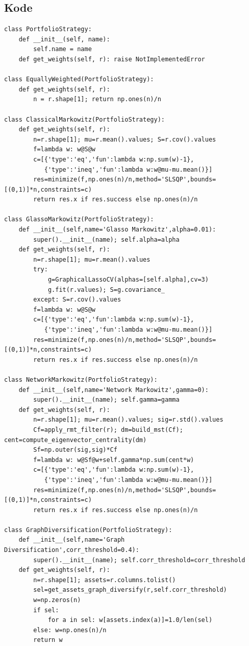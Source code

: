 \documentclass[12pt,a4paper]{article}
\begin{document}
\subsection{Kode}
\begin{lstlisting}[caption={Implementasi berbagai strategi portofolio}]
class PortfolioStrategy:
    def __init__(self, name):
        self.name = name
    def get_weights(self, r): raise NotImplementedError

class EquallyWeighted(PortfolioStrategy):
    def get_weights(self, r):
        n = r.shape[1]; return np.ones(n)/n

class ClassicalMarkowitz(PortfolioStrategy):
    def get_weights(self, r):
        n=r.shape[1]; mu=r.mean().values; S=r.cov().values
        f=lambda w: w@S@w
        c=[{'type':'eq','fun':lambda w:np.sum(w)-1},
           {'type':'ineq','fun':lambda w:w@mu-mu.mean()}]
        res=minimize(f,np.ones(n)/n,method='SLSQP',bounds=[(0,1)]*n,constraints=c)
        return res.x if res.success else np.ones(n)/n

class GlassoMarkowitz(PortfolioStrategy):
    def __init__(self,name='Glasso Markowitz',alpha=0.01):
        super().__init__(name); self.alpha=alpha
    def get_weights(self, r):
        n=r.shape[1]; mu=r.mean().values
        try:
            g=GraphicalLassoCV(alphas=[self.alpha],cv=3)
            g.fit(r.values); S=g.covariance_
        except: S=r.cov().values
        f=lambda w: w@S@w
        c=[{'type':'eq','fun':lambda w:np.sum(w)-1},
           {'type':'ineq','fun':lambda w:w@mu-mu.mean()}]
        res=minimize(f,np.ones(n)/n,method='SLSQP',bounds=[(0,1)]*n,constraints=c)
        return res.x if res.success else np.ones(n)/n

class NetworkMarkowitz(PortfolioStrategy):
    def __init__(self,name='Network Markowitz',gamma=0):
        super().__init__(name); self.gamma=gamma
    def get_weights(self, r):
        n=r.shape[1]; mu=r.mean().values; sig=r.std().values
        Cf=apply_rmt_filter(r); dm=build_mst(Cf); cent=compute_eigenvector_centrality(dm)
        Sf=np.outer(sig,sig)*Cf
        f=lambda w: w@Sf@w+self.gamma*np.sum(cent*w)
        c=[{'type':'eq','fun':lambda w:np.sum(w)-1},
           {'type':'ineq','fun':lambda w:w@mu-mu.mean()}]
        res=minimize(f,np.ones(n)/n,method='SLSQP',bounds=[(0,1)]*n,constraints=c)
        return res.x if res.success else np.ones(n)/n

class GraphDiversification(PortfolioStrategy):
    def __init__(self,name='Graph Diversification',corr_threshold=0.4):
        super().__init__(name); self.corr_threshold=corr_threshold
    def get_weights(self, r):
        n=r.shape[1]; assets=r.columns.tolist()
        sel=get_assets_graph_diversify(r,self.corr_threshold)
        w=np.zeros(n)
        if sel:
            for a in sel: w[assets.index(a)]=1.0/len(sel)
        else: w=np.ones(n)/n
        return w


\end{lstlisting}
\end{document}
